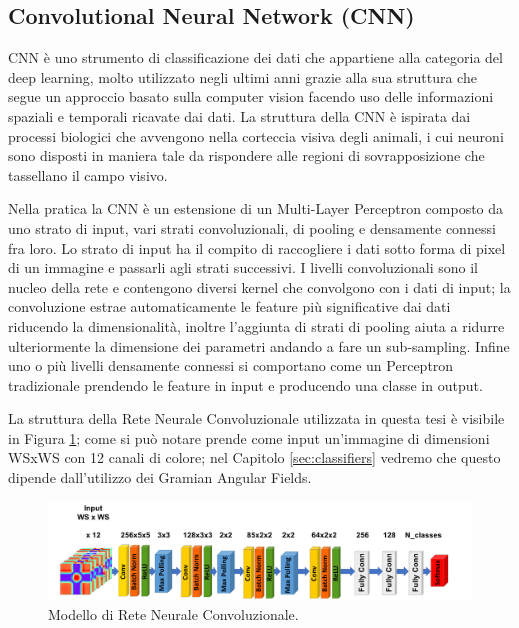 \subsection{Convolutional Neural Network (CNN)}
\label{ssec:cnn}

CNN è uno strumento di classificazione dei dati che appartiene alla categoria del deep learning, molto utilizzato negli ultimi anni grazie alla sua struttura che segue un approccio basato sulla computer vision facendo uso delle informazioni spaziali e temporali ricavate dai dati. La struttura della CNN è ispirata dai processi biologici che avvengono nella corteccia visiva degli animali, i cui neuroni sono disposti in maniera tale da rispondere alle regioni di sovrapposizione che tassellano il campo visivo.

Nella pratica la CNN è un estensione di un Multi-Layer Perceptron composto da uno strato di input, vari strati convoluzionali, di pooling e densamente connessi fra loro. Lo strato di input ha il compito di raccogliere i dati sotto forma di pixel di un immagine e passarli agli strati successivi. I livelli convoluzionali sono il nucleo della rete e contengono diversi kernel che convolgono con i dati di input; la convoluzione estrae automaticamente le feature più significative dai dati riducendo la dimensionalità, inoltre l'aggiunta di strati di pooling aiuta a ridurre ulteriormente la dimensione dei parametri 
andando a fare un sub-sampling. Infine uno o più livelli densamente connessi si comportano come un Perceptron tradizionale prendendo le feature in input e producendo una classe in output.

La struttura della Rete Neurale Convoluzionale utilizzata in questa tesi è visibile in Figura \ref{fig:cnn-model}; come si può notare prende come input un'immagine di dimensioni WSxWS con 12 canali di colore; nel Capitolo \ref{sec:classifiers} vedremo che questo dipende dall'utilizzo dei Gramian Angular Fields.

\begin{figure}[!htb]
    \centering
    \includegraphics[width=\textwidth]{figure/cnn_model.png}
    \caption{Modello di Rete Neurale Convoluzionale.}
    \label{fig:cnn-model}
\end{figure}

